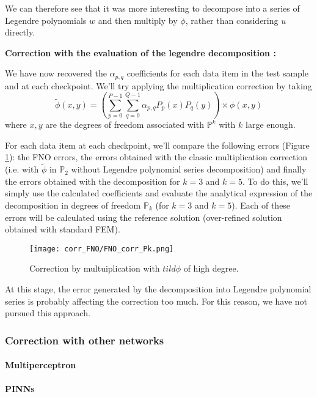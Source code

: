 We can therefore see that it was more interesting to decompose into a series of Legendre polynomials $w$ and then multiply by $\phi$, rather than considering $u$ directly.

\textbf{Correction with the evaluation of the legendre decomposition :}

We have now recovered the $\alpha_{p,q}$ coefficients for each data item in the test sample and at each checkpoint. We'll try applying the multiplication correction by taking 
\begin{equation*}
	\tilde{\phi}(x,y)=\left(\sum_{p=0}^{P-1}\sum_{q=0}^{Q-1}\alpha_{p,q} P_p(x)P_q(y)\right)\times \phi(x,y)
\end{equation*}
where $x,y$ are the degrees of freedom associated with $\mathbb{P}^k$ with $k$ large enough.

For each data item at each checkpoint, we'll compare the following errors (Figure \ref{FNO_corr_Pk}): the FNO errors, the errors obtained with the classic multiplication correction (i.e. with $\tilde{\phi}$ in $\mathbb{P}_2$ without Legendre polynomial series decomposition) and finally the errors obtained with the decomposition for $k=3$ and $k=5$. To do this, we'll simply use the calculated coefficients and evaluate the analytical expression of the decomposition in degrees of freedom $\mathbb{P}_k$ (for $k=3$ and $k=5$). Each of these errors will be calculated using the reference solution (over-refined solution obtained with standard FEM).

\begin{figure}[H]
	\centering
	\texttt{[image: corr\_FNO/FNO\_corr\_Pk.png]}
	\caption{Correction by multuiplication with $tild{\phi}$ of high degree.}
	\label{FNO_corr_Pk}
\end{figure} 

At this stage, the error generated by the decomposition into Legendre polynomial series is probably affecting the correction too much. For this reason, we have not pursued this approach.

\subsubsection{Correction with other networks} \label{Corr.results.neural_net}

\paragraph{Multiperceptron} \label{Corr.results.neural_net.multiperceptron}

\paragraph{PINNs} \label{Corr.results.neural_net.PINNs}